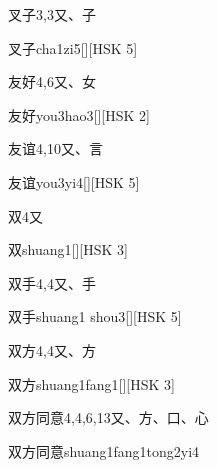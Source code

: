 \begin{entry}{叉子}{3,3}{⼜、⼦}
  \begin{phonetics}{叉子}{cha1zi5}[][HSK 5]
  \end{phonetics}
\end{entry}

\begin{entry}{友好}{4,6}{⼜、⼥}
  \begin{phonetics}{友好}{you3hao3}[][HSK 2]
  \end{phonetics}
\end{entry}

\begin{entry}{友谊}{4,10}{⼜、⾔}
  \begin{phonetics}{友谊}{you3yi4}[][HSK 5]
  \end{phonetics}
\end{entry}

\begin{entry}{双}{4}{⼜}
  \begin{phonetics}{双}{shuang1}[][HSK 3]
  \end{phonetics}
\end{entry}

\begin{entry}{双手}{4,4}{⼜、⼿}
  \begin{phonetics}{双手}{shuang1 shou3}[][HSK 5]
  \end{phonetics}
\end{entry}

\begin{entry}{双方}{4,4}{⼜、⽅}
  \begin{phonetics}{双方}{shuang1fang1}[][HSK 3]
  \end{phonetics}
\end{entry}

\begin{entry}{双方同意}{4,4,6,13}{⼜、⽅、⼝、⼼}
  \begin{phonetics}{双方同意}{shuang1fang1tong2yi4}
  \end{phonetics}
\end{entry}

